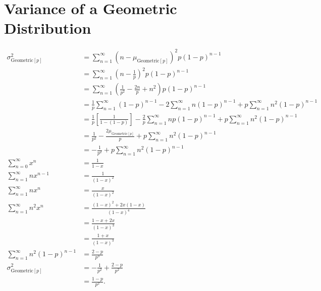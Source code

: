 \documentclass{myart}
\newcommand{\mean}{\mu}
\newcommand{\variance}{\sigma^2}
\newcommand{\sub}[1]{_{\text{#1}}}
\begin{document}
\section{Variance of a Geometric Distribution}

\begin{align*}
\variance\sub{Geometric$[p]$} &= \sum_{n=1}^\infty (n - \mean\sub{Geometric$[p]$})^2 p (1-p)^{n-1} \\
&= \sum_{n=1}^\infty \left(n - \frac{1}{p}\right)^2 p (1-p)^{n-1} \\
&= \sum_{n=1}^\infty \left(\frac{1}{p^2} - \frac{2n}{p} + n^2\right) p (1-p)^{n-1} \\
&= \frac{1}{p} \sum_{n=1}^\infty (1-p)^{n-1} - 2 \sum_{n=1}^\infty n(1-p)^{n-1} + p \sum_{n=1}^\infty n^2 (1-p)^{n-1} \\
&= \frac{1}{p} \left[\frac{1}{1 - (1-p)}\right] - \frac{2}{p} \sum_{n=1}^\infty n p (1-p)^{n-1} + p \sum_{n=1}^\infty n^2 (1-p)^{n-1} \\
&= \frac{1}{p^2} - \frac{2 \mean\sub{Geometric$[p]$}}{p} + p \sum_{n=1}^\infty n^2 (1-p)^{n-1} \\
&= -\frac{1}{p^2} + p \sum_{n=1}^\infty n^2 (1-p)^{n-1} \\
\sum_{n=0}^\infty x^n &= \frac{1}{1-x} \\
\sum_{n=1}^\infty n x^{n-1} &= \frac{1}{(1-x)^2} \\
\sum_{n=1}^\infty n x^n &= \frac{x}{(1-x)^2} \\
\sum_{n=1}^\infty n^2 x^n &= \frac{(1-x)^2 + 2x(1-x)}{(1-x)^4} \\
&= \frac{1 - x + 2x}{(1-x)^3} \\
&= \frac{1+x}{(1-x)^3} \\
\sum_{n=1}^\infty n^2 (1-p)^{n-1} &= \frac{2-p}{p^3} \\
\variance\sub{Geometric$[p]$} &= -\frac{1}{p^2} + \frac{2-p}{p^2} \\
&= \frac{1-p}{p^2}.
\end{align*}
\end{document}
